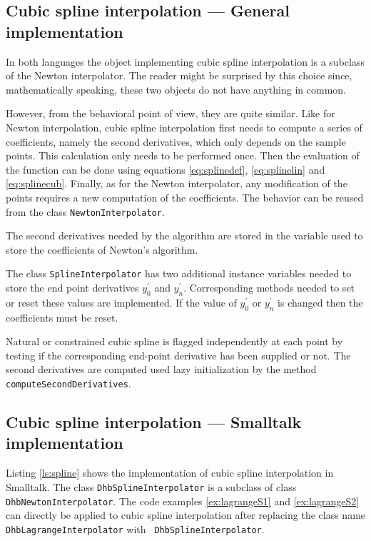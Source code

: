 \documentclass[twoside]{book}
\begin{document}
\subsection{Cubic spline interpolation --- General  implementation}
 In both languages the object
implementing cubic spline interpolation is a subclass of the
Newton interpolator. The reader might be surprised by this choice
since, mathematically speaking, these two objects do not have
anything in common.

However, from the behavioral point of view, they are quite
similar. Like for Newton interpolation, cubic spline interpolation
first needs to compute a series of coefficients, namely the second
derivatives, which only depends on the sample points. This
calculation only needs to be performed once. Then the evaluation
of the function can be done using equations \ref{eq:splinedef},
\ref{eq:splinelin} and \ref{eq:splinecub}. Finally, as for the
Newton interpolator, any modification of the points requires a new
computation of the coefficients. The behavior can be reused from
the class {\tt NewtonInterpolator}.

The second derivatives needed by the algorithm are stored in the
variable used to store the coefficients of Newton's algorithm.

The class {\tt SplineInterpolator} has two additional instance
variables needed to store the end point derivatives $y^{\prime}_0$
and $y^{\prime}_n$. Corresponding methods needed to set or reset
these values are implemented. If the value of $y^{\prime}_0$ or
$y^{\prime}_n$ is changed then the coefficients must be reset.

Natural or constrained cubic spline is flagged independently at
each point by testing if the corresponding end-point derivative
has been supplied or not. The second derivatives are computed used
lazy initialization by the method {\tt computeSecondDerivatives}.

\subsection{Cubic spline interpolation --- Smalltalk  implementation}
Listing \ref{ls:spline} shows the implementation of cubic spline
interpolation in Smalltalk. The class {\tt DhbSplineInterpolator}
is a subclass of class {\tt DhbNewtonInterpolator}. The code
examples \ref{ex:lagrangeS1} and \ref{ex:lagrangeS2} can directly
be applied to cubic spline interpolation after replacing the class
name {\tt DhbLagrangeInterpolator} with {\tt
DhbSplineInterpolator}.
\end{document}
